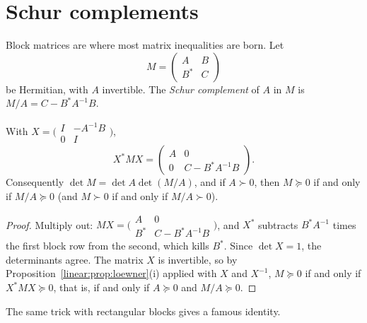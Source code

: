 \section{Schur complements}

Block matrices are where most matrix inequalities are born. Let
\[
M=\begin{pmatrix}A&B\\B^*&C\end{pmatrix}
\]
be Hermitian, with $A$ invertible. The \emph{Schur complement} of $A$ in $M$ is $M/A=C-B^*A^{-1}B$.

\begin{proposition}\label{linear:prop:schurcomplement}
With $X=\bigl(\begin{smallmatrix}I&-A^{-1}B\\0&I\end{smallmatrix}\bigr)$,
\[
X^*MX=\begin{pmatrix}A&0\\0&C-B^*A^{-1}B\end{pmatrix}.
\]
Consequently $\det M=\det A\det(M/A)$, and if $A\succ0$, then $M\succeq0$ if and only if $M/A\succeq0$ (and $M\succ0$ if and only if
$M/A\succ0$).
\end{proposition}
\begin{proof}
Multiply out: $MX=\bigl(\begin{smallmatrix}A&0\\B^*&C-B^*A^{-1}B\end{smallmatrix}\bigr)$, and $X^*$ subtracts $B^*A^{-1}$ times the first block
row from the second, which kills $B^*$. Since $\det X=1$, the determinants agree. The matrix $X$ is invertible, so by
Proposition~\ref{linear:prop:loewner}(i) applied with $X$ and $X^{-1}$, $M\succeq0$ if and only if $X^*MX\succeq0$, that is, if and only if
$A\succeq0$ and $M/A\succeq0$.
\end{proof}

The same trick with rectangular blocks gives a famous identity.

